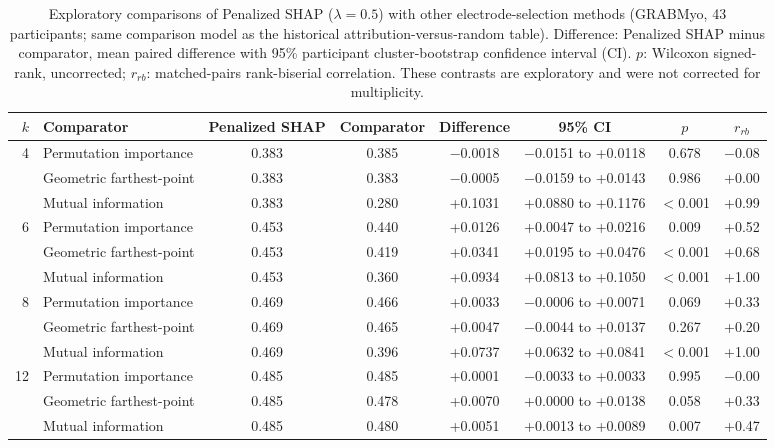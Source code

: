 \begin{table}[htbp]
\centering
\small
\caption{Exploratory comparisons of Penalized SHAP ($\lambda = 0.5$) with other electrode-selection methods (GRABMyo, 43 participants; same comparison model as the historical attribution-versus-random table). Difference: Penalized SHAP minus comparator, mean paired difference with 95\% participant cluster-bootstrap confidence interval (CI). $p$: Wilcoxon signed-rank, uncorrected; $r_{rb}$: matched-pairs rank-biserial correlation. These contrasts are exploratory and were not corrected for multiplicity.}
\label{tab:selection_explor}
\setlength{\tabcolsep}{4pt}
\begin{adjustbox}{max width=\textwidth}
\begin{tabular}{rlcccccc}
\toprule
$k$ & Comparator & Penalized SHAP & Comparator & Difference & 95\% CI & $p$ & $r_{rb}$ \\
\midrule
4 & Permutation importance & 0.383 & 0.385 & $-$0.0018 & $-$0.0151 to +0.0118 & 0.678 & $-$0.08 \\
 & Geometric farthest-point & 0.383 & 0.383 & $-$0.0005 & $-$0.0159 to +0.0143 & 0.986 & +0.00 \\
 & Mutual information & 0.383 & 0.280 & +0.1031 & +0.0880 to +0.1176 & $<$0.001 & +0.99 \\
\midrule 6 & Permutation importance & 0.453 & 0.440 & +0.0126 & +0.0047 to +0.0216 & 0.009 & +0.52 \\
 & Geometric farthest-point & 0.453 & 0.419 & +0.0341 & +0.0195 to +0.0476 & $<$0.001 & +0.68 \\
 & Mutual information & 0.453 & 0.360 & +0.0934 & +0.0813 to +0.1050 & $<$0.001 & +1.00 \\
\midrule 8 & Permutation importance & 0.469 & 0.466 & +0.0033 & $-$0.0006 to +0.0071 & 0.069 & +0.33 \\
 & Geometric farthest-point & 0.469 & 0.465 & +0.0047 & $-$0.0044 to +0.0137 & 0.267 & +0.20 \\
 & Mutual information & 0.469 & 0.396 & +0.0737 & +0.0632 to +0.0841 & $<$0.001 & +1.00 \\
\midrule 12 & Permutation importance & 0.485 & 0.485 & +0.0001 & $-$0.0033 to +0.0033 & 0.995 & $-$0.00 \\
 & Geometric farthest-point & 0.485 & 0.478 & +0.0070 & +0.0000 to +0.0138 & 0.058 & +0.33 \\
 & Mutual information & 0.485 & 0.480 & +0.0051 & +0.0013 to +0.0089 & 0.007 & +0.47 \\
\bottomrule
\end{tabular}
\end{adjustbox}
\end{table}
